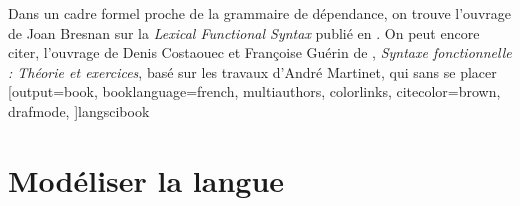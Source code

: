    Dans un cadre formel proche de la grammaire de dépendance, on trouve l’ouvrage de Joan Bresnan sur la \textit{Lexical Functional Syntax} publié en \citeyear{bresnan2001lexical}. On peut encore citer, l’ouvrage de Denis Costaouec et Françoise Guérin de \citeyear{costaouec2007syntaxe}, \textit{Syntaxe fonctionnelle : Théorie et exercices}, basé sur les travaux d’André Martinet, qui sans se placer
  [output=book,
   booklanguage=french, 
   multiauthors,
   colorlinks,
   citecolor=brown,
   drafmode,
  ]{langscibook}








% 




\maketitle
\frontmatter
\tableofcontents
\newpage{}
\mainmatter




\part{Modéliser la langue}

%
%
%

\part{}\label{sec:2}
%
%
%
%

